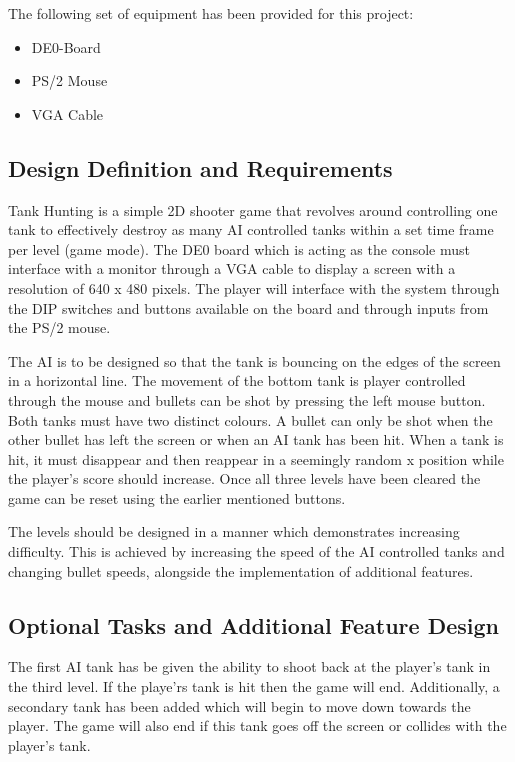 \documentclass{article}
\begin{document}
The following set of equipment has been provided for this project:

\begin{itemize}
\item DE0-Board
\item PS/2 Mouse
\item VGA Cable
\end{itemize}

\subsection{Design Definition and Requirements}

Tank Hunting is a simple 2D shooter game that revolves around controlling one tank to effectively destroy as many AI controlled tanks within a set time frame per level (game mode). The DE0 board which is acting as the console must interface with a monitor through a VGA cable to display a screen with a resolution of 640 x 480 pixels. The player will interface with the system through the DIP switches and buttons available on the board and through inputs from the PS/2 mouse.

The AI is to be designed so that the tank is bouncing on the edges of the screen in a horizontal line. The movement of the bottom tank is player controlled through the mouse and bullets can be shot by pressing the left mouse button. Both tanks must have two distinct colours. A bullet can only be shot when the other bullet has left the screen or when an AI tank has been hit. When a tank is hit, it must disappear and then reappear in a seemingly random x position while the player’s score should increase. Once all three levels have been cleared the game can be reset using the earlier mentioned buttons.

The levels should be designed in a manner which demonstrates increasing difficulty. This is achieved by increasing the speed of the AI controlled tanks and changing bullet speeds, alongside the implementation of additional features. 

\subsection{Optional Tasks and Additional Feature Design}

The first AI tank has be given the ability to shoot back at the player’s tank in the third level. If the playe'rs tank is hit then the game will end. Additionally, a secondary tank has been added which will begin to move down towards the player. The game will also end if this tank goes off the screen or collides with the player’s tank. 
\end{document}
